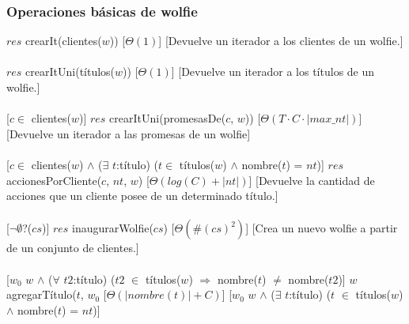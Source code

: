   \subsubsection{Operaciones b\'asicas de wolfie}
  {$res$ \igobs crearIt(clientes($w$))}
  [$\Theta(1)$]
  [Devuelve un iterador a los clientes de un wolfie.]\\\\
  {$res$ \igobs crearItUni(t\'itulos($w$))}%
  [$\Theta(1)$]
  [Devuelve un iterador a los t\'itulos de un wolfie.]\\\\
  [$c \in$ clientes($w$)]
  {$res$ \igobs crearItUni(promesasDe($c$, $w$))}%
  [$\Theta(T \cdotp C \cdotp |max\_nt|)$]
  [Devuelve un iterador a las promesas de un wolfie]\\\\
  [$c \in$ clientes($w$) $\land$ ($\exists$ $t$:t\'itulo) ($t \in$ t\'itulos($w$) $\land$ nombre($t$) = $nt$)]
  {$res$ \igobs accionesPorCliente($c$, $nt$, $w$)}%
  [$\Theta(log(C)+|nt|)$]
  [Devuelve la cantidad de acciones que un cliente posee de un determinado t\'itulo.]\\\\
  [$\neg\emptyset$?($cs$)]
  {$res$ \igobs inaugurarWolfie($cs$)}
  [$\Theta(\#(cs)^2)$]
  [Crea un nuevo wolfie a partir de un conjunto de clientes.]\\\\  %
  [$w_{0}$ \igobs $w$ $\land$ ($\forall$ $t2$:t\'itulo) ($t2$ $\in$ t\'itulos($w$) $\Rightarrow$ nombre($t$) $\neq$ nombre($t2$)]
  {$w$ \igobs agregarT\'itulo($t$, $w_{0}$}%
  [$\Theta(|nombre(t)|+C)$]
  [$w_{0}$ \igobs $w$ $\land$ ($\exists$ $t$:t\'itulo) ($t$ $\in$ t\'itulos($w$) $\land$ nombre($t$) = $nt$)]
